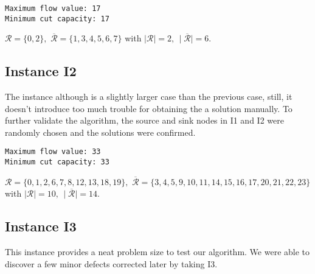 \documentclass[11pt]{article}
\begin{document}
\begin{verbatim}
Maximum flow value: 17
Minimum cut capacity: 17
\end{verbatim}
$\mathcal{R}=\{0,2\},$
$\mathcal{\overline{R}}=\{1,3,4,5,6,7\}$ with $\mid\mathcal{R}\mid=2,\,\mid\mathcal{\overline{R}}\mid=6$.



\subsection{Instance I2}
The instance although is a slightly larger case than the previous case, still, it doesn't introduce too much trouble for obtaining the a solution manually. To further validate the algorithm, the source and sink nodes in I1 and I2 were randomly chosen and the solutions were confirmed.%



\begin{verbatim}
Maximum flow value: 33
Minimum cut capacity: 33
\end{verbatim}
$\mathcal{R}=\{0,1,2,6,7,8,12,13,18,19\},$
$\mathcal{\overline{R}}=\{3,4,5,9,10,11,14,15,16,17,20,21,22,23\}$ with $\mid\mathcal{R}\mid=10,\,\mid\mathcal{\overline{R}}\mid=14$.

\subsection{Instance I3}
This instance provides a neat problem size to test our algorithm. We were able to discover a few minor defects corrected later by taking I3.%
\end{document}
